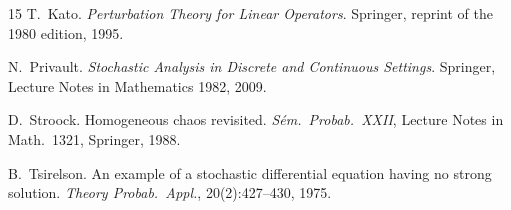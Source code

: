 \documentclass[11pt,a4paper]{article}
\theoremstyle{plain}
\theoremstyle{definition}
\theoremstyle{remark}
\begin{document}
\begin{thebibliography}{15}
T.~Kato.
\newblock \emph{Perturbation Theory for Linear Operators}.
\newblock Springer, reprint of the 1980 edition, 1995.

N.~Privault.
\newblock \emph{Stochastic Analysis in Discrete and Continuous Settings}.
\newblock Springer, Lecture Notes in Mathematics 1982, 2009.

D.~Stroock.
\newblock Homogeneous chaos revisited.
\newblock \emph{S\'em.\ Probab.\ XXII}, Lecture Notes in Math.\ 1321, Springer, 1988.

B.~Tsirelson.
\newblock An example of a stochastic differential equation having no strong solution.
\newblock \emph{Theory Probab.\ Appl.}, 20(2):427--430, 1975.

\end{thebibliography}
\end{document}
